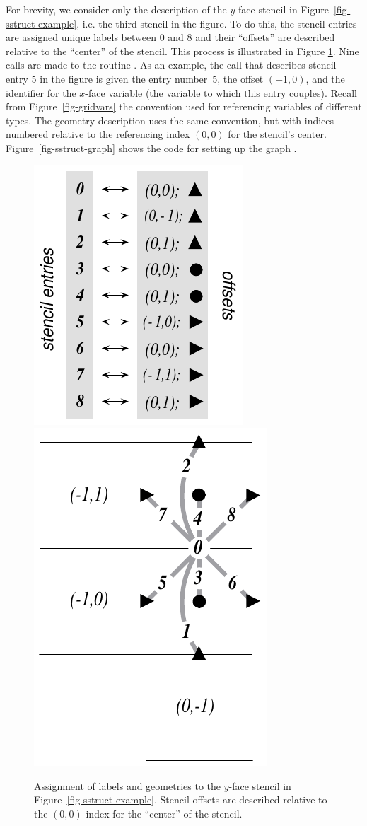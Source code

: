 For brevity, we consider only the description of the $y$-face stencil in
Figure~\ref{fig-sstruct-example}, i.e. the third stencil in the figure.  To do
this, the stencil entries are assigned unique labels between 0 and 8 and their
``offsets'' are described relative to the ``center'' of the stencil.  This
process is illustrated in Figure \ref{fig-sstruct-stencil}.  Nine calls are
made to the routine .  As an example, the
call that describes stencil entry 5 in the figure is given the entry number~5,
the offset $(-1,0)$, and the identifier for the $x$-face variable (the variable
to which this entry couples).  Recall from Figure~\ref{fig-gridvars} the
convention used for referencing variables of different types.  The geometry
description uses the same convention, but with indices numbered relative to the
referencing index $(0,0)$ for the stencil's center.
Figure~\ref{fig-sstruct-graph} shows the code for setting up the graph .
\begin{figure}
\centering
\mbox{}\hfill
\includegraphics[width=.3\textwidth]{figSStructStenc0}
\hfill
\includegraphics[width=.25\textwidth]{figSStructStenc1}
\hfill\mbox{}
\caption{%
Assignment of labels and geometries to the $y$-face stencil in
Figure~\ref{fig-sstruct-example}.  Stencil offsets are described relative to
the $(0,0)$ index for the ``center'' of the stencil.}
\label{fig-sstruct-stencil}
\end{figure}

